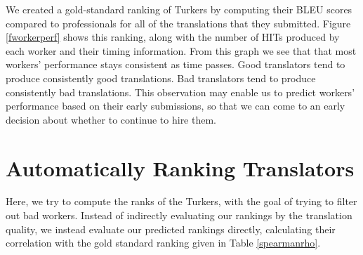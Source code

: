 \documentclass[11pt]{article}
\begin{document}
We created a gold-standard ranking of Turkers by computing their BLEU scores compared to professionals for all of the translations that they submitted.  %
Figure \ref{fworkerperf} shows this ranking, along with the number of HITs produced by each worker and their timing information.
From this graph we see that that most workers' performance stays
consistent as time passes.  Good translators tend to produce consistently good translations.  Bad translators tend to produce consistently bad translations.  This observation may enable us to predict workers' performance based on their early submissions, so that we can come to an early decision about whether to continue to hire them. 


\section{Automatically Ranking Translators}


Here, we try to compute the ranks of the Turkers, with the goal of trying to filter out bad workers.  Instead of indirectly evaluating our rankings by the translation quality, we instead evaluate our predicted rankings directly, calculating their correlation with the gold standard ranking given in Table \ref{spearmanrho}.
\end{document}
